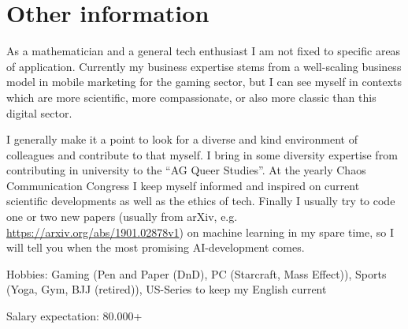 \documentclass[a4paper]{twentysecondcv} %
\begin{document}
\section{Other information}
As a mathematician and a general tech enthusiast I am not fixed to specific areas of application.
Currently my business expertise stems from a well-scaling business model in mobile marketing for
the gaming sector, but I can see myself in contexts which are more scientific, more compassionate,
or also more classic than this digital sector. 

I generally make it a point to look for a diverse and kind environment of colleagues and 
contribute to that myself. I bring in some diversity expertise from contributing in university
to the ``AG Queer Studies''. At the yearly Chaos Communication Congress I keep 
myself informed and inspired on current scientific developments as well as the ethics of tech. 
Finally I usually try to code one or two new papers 
(usually from arXiv, e.g. \href{https://arxiv.org/abs/1901.02878v1}{https://arxiv.org/abs/1901.02878v1}) on machine 
learning in my spare time, so I will tell you when the most promising AI-development comes.

Hobbies: Gaming (Pen and Paper (DnD), PC (Starcraft, Mass Effect)), 
Sports (Yoga, Gym, BJJ (retired)), US-Series to keep my English current

Salary expectation: 80.000\EUR+
\end{document}
